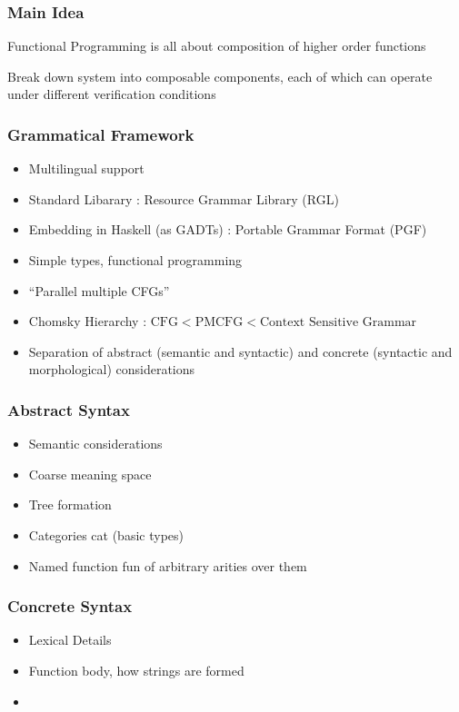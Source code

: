 \documentclass{beamer}
\begin{document}
\begin{frame}
\frametitle{Main Idea}

Functional Programming is all about composition of higher order functions

Break down system into composable components, each of which can operate under
different verification conditions


\end{frame}

\begin{frame}
\frametitle{Grammatical Framework}
\begin{itemize}[<+->]
\item Multilingual support
\item Standard Libarary : Resource Grammar Library (RGL)
\item Embedding in Haskell (as GADTs) : Portable Grammar Format (PGF)
\item Simple types, functional programming
\item ``Parallel multiple CFGs''
\item Chomsky Hierarchy : $\text{CFG} < \text{PMCFG} < \text{Context Sensitive Grammar}$
\item Separation of abstract (semantic and syntactic) and concrete (syntactic and
 morphological) considerations
\end{itemize}
\end{frame}

\begin{frame}
\frametitle{Abstract Syntax}
\begin{itemize}[<+->]
\item Semantic considerations
\item Coarse meaning space
\item Tree formation
\item Categories cat (basic types)
\item Named function fun of arbitrary arities over them
\end{itemize}
\end{frame}

\begin{frame}
\frametitle{Concrete Syntax}
\begin{itemize}[<+->]
\item Lexical Details
\item Function body, how strings are formed
\item 
\end{itemize}
\end{frame}
\end{document}
